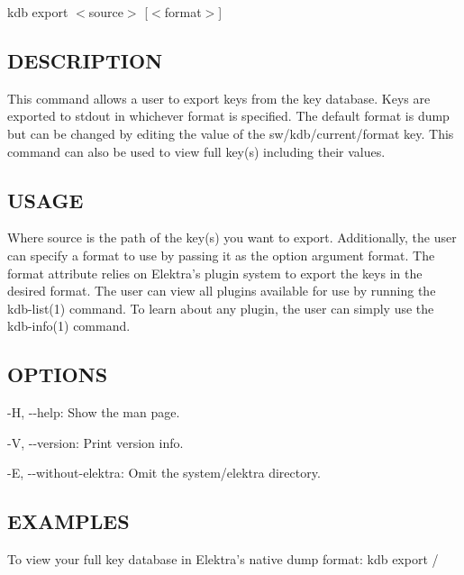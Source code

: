 {\ttfamily kdb export $<$source$>$ \mbox{[}$<$format$>$\mbox{]}}

\subsection*{D\+E\+S\+C\+R\+I\+P\+T\+I\+O\+N}

This command allows a user to export keys from the key database. Keys are exported to {\ttfamily stdout} in whichever format is specified. The default format is {\ttfamily dump} but can be changed by editing the value of the {\ttfamily sw/kdb/current/format} key. This command can also be used to view full key(s) including their values.

\subsection*{U\+S\+A\+G\+E}

Where {\ttfamily source} is the path of the key(s) you want to export. Additionally, the user can specify a format to use by passing it as the option argument {\ttfamily format}. The {\ttfamily format} attribute relies on Elektra's plugin system to export the keys in the desired format. The user can view all plugins available for use by running the kdb-\/list(1) command. To learn about any plugin, the user can simply use the kdb-\/info(1) command.

\subsection*{O\+P\+T\+I\+O\+N\+S}


\begin{DoxyItemize}
\item {\ttfamily -\/\+H}, {\ttfamily -\/-\/help}\+: Show the man page.
\item {\ttfamily -\/\+V}, {\ttfamily -\/-\/version}\+: Print version info.
\item {\ttfamily -\/\+E}, {\ttfamily -\/-\/without-\/elektra}\+: Omit the {\ttfamily system/elektra} directory.
\end{DoxyItemize}

\subsection*{E\+X\+A\+M\+P\+L\+E\+S}

To view your full key database in Elektra's native {\ttfamily dump} format\+: {\ttfamily kdb export /}

